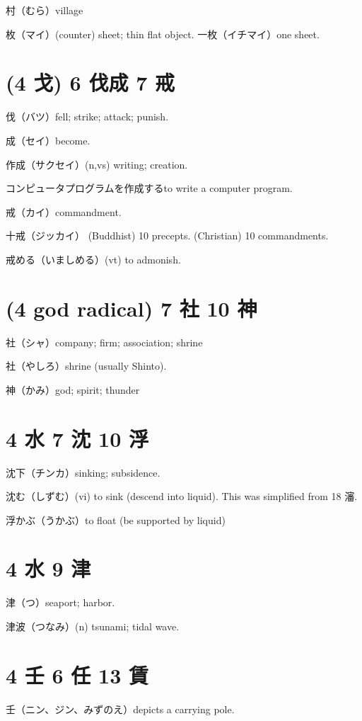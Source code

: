 村（むら）village

枚（マイ）(counter) sheet; thin flat object.
一枚（イチマイ）one sheet.

\section{(4 戈) 6 伐成 7 戒}

伐（バツ）fell; strike; attack; punish.

成（セイ）become.

作成（サクセイ）(n,vs) writing; creation.

コンピュータプログラムを作成するto write a computer program.

戒（カイ）commandment.

十戒（ジッカイ）
(Buddhist) 10 precepts.
(Christian) 10 commandments.

戒める（いましめる）(vt) to admonish.

\section{(4 god radical) 7 社 10 神}

社（シャ）company; firm; association; shrine

社（やしろ）shrine (usually Shinto).

神（かみ）god; spirit; thunder

\section{4 水 7 沈 10 浮}

沈下（チンカ）sinking; subsidence.

沈む（しずむ）(vi) to sink (descend into liquid).
This was simplified from 18 瀋.

浮かぶ（うかぶ）to float (be supported by liquid)

\section{4 水 9 津}

津（つ）seaport; harbor.

津波（つなみ）(n) tsunami; tidal wave.

\section{4 壬 6 任 13 賃}

壬（ニン、ジン、みずのえ）depicts a carrying pole.

